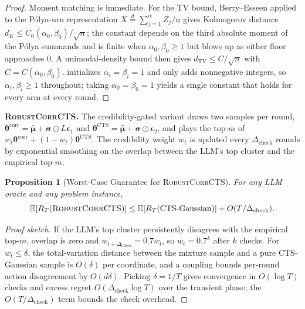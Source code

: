 \documentclass{article}
\theoremstyle{plain}
\newtheorem{proposition}[theorem]{Proposition}
\theoremstyle{definition}
\theoremstyle{remark}
\newcommand{\E}{\mathbb{E}}
\newcommand{\RobustCorr}{\textsc{RobustCorrCTS}}
\begin{document}
\begin{proof}
Moment matching is immediate.
For the TV bound, Berry--Esseen \citep{berry1941accuracy} applied to the Pólya-urn representation $X \stackrel{d}{=} \sum_{j=1}^{\alpha} Z_j / n$ gives Kolmogorov distance $d_K \leq C_0(\alpha_0, \beta_0)/\sqrt{n}$; the constant depends on the third absolute moment of the Pólya summands and is finite when $\alpha_0, \beta_0 \geq 1$ but blows up as either floor approaches $0$.
A unimodal-density bound then gives $d_{\mathrm{TV}} \leq C/\sqrt{n}$ with $C = C(\alpha_0, \beta_0)$.
 initializes $\alpha_i = \beta_i = 1$ and only adds nonnegative integers, so $\alpha_i, \beta_i \geq 1$ throughout; taking $\alpha_0 = \beta_0 = 1$ yields a single constant that holds for every arm at every round.
\end{proof}

\textbf{\RobustCorr.}
The credibility-gated variant draws two samples per round, $\boldsymbol\theta^{\mathrm{corr}} = \bar{\boldsymbol\mu} + \boldsymbol\sigma \odot L \boldsymbol\epsilon_1$ and $\boldsymbol\theta^{\mathrm{CTS}} = \bar{\boldsymbol\mu} + \boldsymbol\sigma \odot \boldsymbol\epsilon_2$, and plays the top-$m$ of $w_t \boldsymbol\theta^{\mathrm{corr}} + (1 - w_t) \boldsymbol\theta^{\mathrm{CTS}}$.
The credibility weight $w_t$ is updated every $\Delta_{\mathrm{check}}$ rounds by exponential smoothing on the overlap between the LLM's top cluster and the empirical top-$m$.

\begin{proposition}[Worst-Case Guarantee for \RobustCorr]\label{prop:robust}
For any LLM oracle and any problem instance,
\[
\E[R_T(\RobustCorr)] \leq \E[R_T(\text{CTS-Gaussian})] + O(T / \Delta_{\mathrm{check}}).
\]
\end{proposition}

\begin{proof}[Proof sketch]
If the LLM's top cluster persistently disagrees with the empirical top-$m$, overlap is zero and $w_{t + \Delta_{\mathrm{check}}} = 0.7 w_t$, so $w_t = 0.7^k$ after $k$ checks.
For $w_t \leq \delta$, the total-variation distance between the mixture sample and a pure CTS-Gaussian sample is $O(\delta)$ per coordinate, and a coupling bounds per-round action disagreement by $O(d\delta)$.
Picking $\delta = 1/T$ gives convergence in $O(\log T)$ checks and excess regret $O(\Delta_{\mathrm{check}} \log T)$ over the transient phase; the $O(T / \Delta_{\mathrm{check}})$ term bounds the check overhead.
\end{proof}
\end{document}
